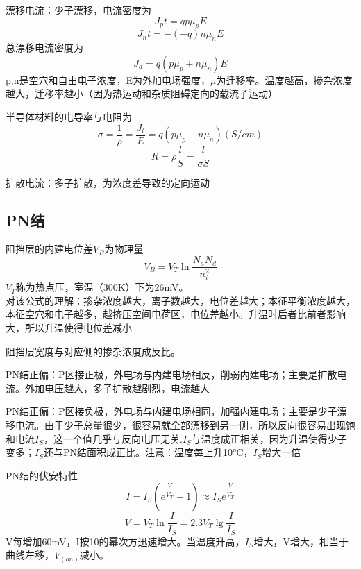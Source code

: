 \documentclass{ctexart}
\begin{document}
漂移电流：少子漂移，电流密度为
\begin{equation}
    J_pt=qp\mu_pE
\end{equation}
\begin{equation}
    J_nt=-(-q)n\mu_nE
\end{equation}
总漂移电流密度为
\begin{equation}
    J_a=q(p\mu_p+n\mu_n)E
\end{equation}
p,n是空穴和自由电子浓度，E为外加电场强度，$\mu$为迁移率。温度越高，掺杂浓度越大，迁移率越小（因为热运动和杂质阻碍定向的载流子运动）

半导体材料的电导率与电阻为
\begin{equation}
    \sigma=\dfrac{1}{\rho}=\dfrac{J_t}{E}=q(p\mu_p+n\mu_n)(S/cm)
\end{equation}
\begin{equation}
    R=\rho \dfrac{l}{S}=\dfrac{l}{\sigma S}
\end{equation}

扩散电流：多子扩散，为浓度差导致的定向运动
\subsection{PN结}
阻挡层的内建电位差$V_B$为物理量
\begin{equation}
    V_B=V_T\ln \dfrac{N_aN_d}{n_i^2}
\end{equation}
$V_T$称为热点压，室温（300K）下为26mV。\\
对该公式的理解：掺杂浓度越大，离子数越大，电位差越大；本征平衡浓度越大，本征空穴和电子越多，越挤压空间电荷区，电位差越小。升温时后者比前者影响大，所以升温使得电位差减小

阻挡层宽度与对应侧的掺杂浓度成反比。

PN结正偏：P区接正极，外电场与内建电场相反，削弱内建电场；主要是扩散电流。外加电压越大，多子扩散越剧烈，电流越大

PN结正偏：P区接负极，外电场与内建电场相同，加强内建电场；主要是少子漂移电流。由于少子总量很少，很容易就全部漂移到另一侧，所以反向很容易出现饱和电流$I_S$，这一个值几乎与反向电压无关.{\color{Red}$I_S$与温度成正相关，因为升温使得少子变多；$I_S$还与PN结面积成正比。注意：温度每上升10°C，$I_S$增大一倍}

PN结的伏安特性
\begin{equation}
    I=I_S(e^{\dfrac{V}{V_T}}-1)\approx I_S e^{\dfrac{V}{V_T}}
\end{equation}
\begin{equation}
    V=V_T\ln \dfrac{I}{I_S}=2.3V_T\lg \dfrac{I}{I_S}
\end{equation}
V每增加60mV，I按10的幂次方迅速增大。当温度升高，$I_S$增大，V增大，相当于曲线左移，$V_{(on)}$减小。
\end{document}
